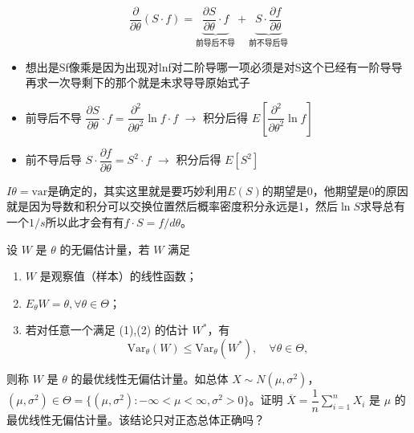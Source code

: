 \begin{note}
    $$\frac{\partial}{\partial\theta}(S\cdot f) = \underbrace{\frac{\partial S}{\partial\theta}\cdot f}_{\text{前导后不导}} + \underbrace{S\cdot\frac{\partial f}{\partial\theta}}_{\text{前不导后导}}$$

\begin{itemize}
  \item 想出是Sf像乘是因为出现对lnf对二阶导哪一项必须是对S这个已经有一阶导导再求一次导剩下的那个就是未求导导原始式子
  \item 前导后不导 $\dfrac{\partial S}{\partial\theta}\cdot f = \dfrac{\partial^2}{\partial\theta^2}\ln f\cdot f$ $\to$ 积分后得 $E\!\left[\dfrac{\partial^2}{\partial\theta^2}\ln f\right]$
  \item 前不导后导 $S\cdot\dfrac{\partial f}{\partial\theta} = S^2\cdot f$ $\to$ 积分后得 $E[S^2]$
\end{itemize}
\end{note}
\begin{dxtips}
    $I\theta=\mathrm{var}$是确定的，其实这里就是要巧妙利用$E(S)$的期望是0，他期望是0的原因就是因为导数和积分可以交换位置然后概率密度积分永远是1，然后$\ln S$求导总有一个$1/s$所以此才会有有$f\cdot S=f/d\theta$。
\end{dxtips}
\begin{homework}[7]
设 $W$ 是 $\theta$ 的无偏估计量，若 $W$ 满足
\begin{enumerate}[(1)]
    \item $W$ 是观察值（样本）的线性函数；
    \item $E_\theta W = \theta, \forall \theta \in \Theta$；
    \item 若对任意一个满足 (1),(2) 的估计 $W^*$，有
    \[
    \mathrm{Var}_\theta(W) \leq \mathrm{Var}_\theta(W^*), \quad \forall \theta \in \Theta,
    \]
\end{enumerate}
则称 $W$ 是 $\theta$ 的最优线性无偏估计量。如总体 $X \sim N(\mu, \sigma^2)$，$(\mu, \sigma^2) \in \Theta = \{(\mu, \sigma^2) : -\infty < \mu < \infty, \sigma^2 > 0\}$。证明 $\overline{X} = \dfrac{1}{n}\sum_{i=1}^{n} X_i$ 是 $\mu$ 的最优线性无偏估计量。该结论只对正态总体正确吗？
\end{homework}
